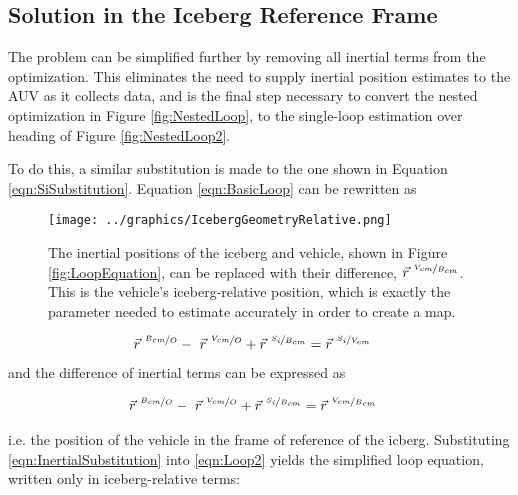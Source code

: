 
\subsection{Solution in the Iceberg Reference Frame}
\label{sec.MainContrib}
The problem can be simplified further by removing all inertial terms from the optimization. This eliminates the need to supply inertial position estimates to the AUV as it collects data, and is the final step necessary to convert the nested optimization in Figure \ref{fig:NestedLoop}, to the single-loop estimation over heading of Figure \ref{fig:NestedLoop2}. 

To do this, a similar substitution is made to the one shown in Equation \ref{eqn:SiSubstitution}. Equation \ref{eqn:BasicLoop} can be rewritten as

\begin{figure}[htbp]
   \centering
   \texttt{[image: ../graphics/IcebergGeometryRelative.png]} %
   \caption{The inertial positions of the iceberg and vehicle, shown in Figure \ref{fig:LoopEquation}, can be replaced with their difference, $ \vec{r}^{~\nicefrac{V_{cm}}{B_{cm}}}$. This is the vehicle's iceberg-relative position, which is exactly the parameter needed to estimate accurately in order to create a map. }
    \label{fig:LoopEquationBergFrame}
\end{figure}

\begin{align}
\vec{r}^{~\nicefrac{B_{cm}}{O}}  - ~\vec{r}^{~\nicefrac{V_{cm}}{O}} + \vec{r}^{~\nicefrac{S_i}{B_{cm}}} &= \vec{r}^{~\nicefrac{S_i}{V_{cm}}}
\label{eqn:Loop2}
\end{align}
and the difference of inertial terms can be expressed as 

\begin{align}
\vec{r}^{~\nicefrac{B_{cm}}{O}}  - ~\vec{r}^{~\nicefrac{V_{cm}}{O}} + \vec{r}^{~\nicefrac{S_i}{B_{cm}}} &= \vec{r}^{~\nicefrac{V_{cm}}{B_{cm}}}
\label{eqn:InertialSubstitution}
\end{align}

i.e. the position of the vehicle in the frame of reference of the icberg. Substituting \ref{eqn:InertialSubstitution} into \ref{eqn:Loop2} yields the simplified loop equation, written only in iceberg-relative terms:

